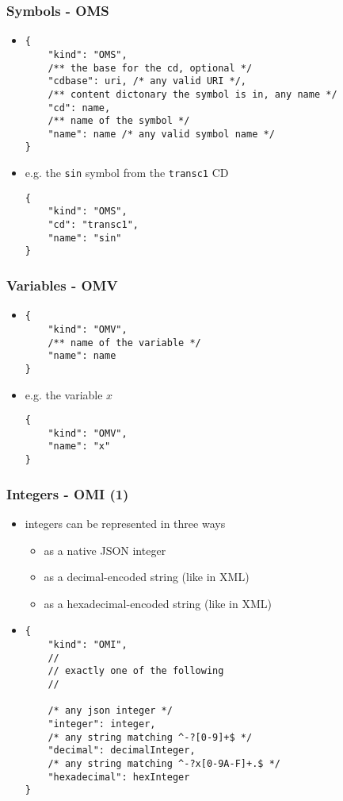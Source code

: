\documentclass[usenames,dvipsnames]{beamer}
\begin{document}
\begin{frame}[fragile]
    \frametitle{Symbols - OMS}
    \begin{itemize}
        \item
\begin{lstlisting}
{
    "kind": "OMS",
    /** the base for the cd, optional */
    "cdbase": uri, /* any valid URI */, 
    /** content dictonary the symbol is in, any name */
    "cd": name,
    /** name of the symbol */
    "name": name /* any valid symbol name */
}
\end{lstlisting}
        \item e.g. the \texttt{sin} symbol from the \texttt{transc1} CD
\begin{lstlisting}
{
    "kind": "OMS",
    "cd": "transc1",
    "name": "sin"
}
\end{lstlisting}
    \end{itemize}
\end{frame}

\begin{frame}[fragile]
    \frametitle{Variables - OMV}
\begin{itemize}
        \item
\begin{lstlisting}
{
    "kind": "OMV",
    /** name of the variable */
    "name": name
}
\end{lstlisting}
        \item e.g. the variable $x$
\begin{lstlisting}
{
    "kind": "OMV",
    "name": "x"
}
\end{lstlisting}
    \end{itemize}
\end{frame}

\begin{frame}[fragile]
    \frametitle{Integers - OMI (1)}
    \begin{itemize}
        \item integers can be represented in three ways
        \begin{itemize}
            \item as a native JSON integer
            \item as a decimal-encoded string (like in XML)
            \item as a hexadecimal-encoded string (like in XML)
        \end{itemize}
        \item 
\begin{lstlisting}
{
    "kind": "OMI",
    //
    // exactly one of the following
    //

    /* any json integer */
    "integer": integer,
    /* any string matching ^-?[0-9]+$ */
    "decimal": decimalInteger,
    /* any string matching ^-?x[0-9A-F]+.$ */
    "hexadecimal": hexInteger
}
\end{lstlisting}
    \end{itemize}
\end{frame}
\end{document}
